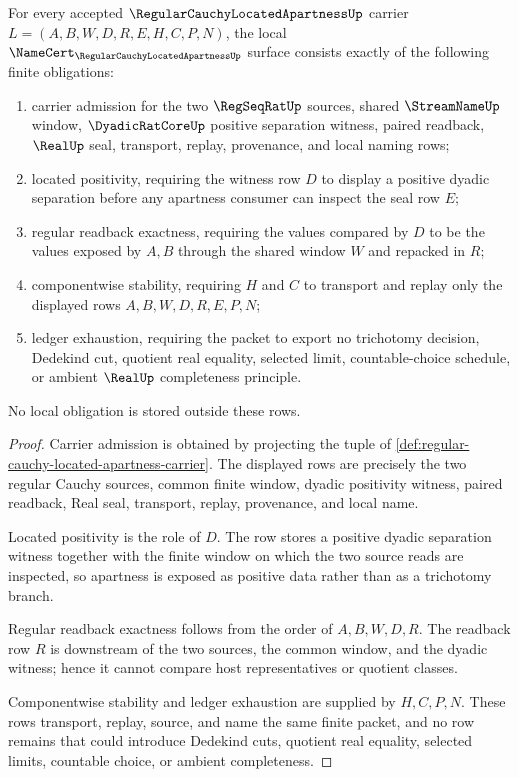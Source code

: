\begin{theorem}
\label{thm:regular-cauchy-located-apartness-namecert-obligations}
For every accepted $\RegularCauchyLocatedApartnessUp$ carrier $L=(A,B,W,D,R,E,H,C,P,N)$, the local $\NameCert_{\RegularCauchyLocatedApartnessUp}$ surface consists exactly of the following finite obligations:
\begin{enumerate}
\item carrier admission for the two $\RegSeqRatUp$ sources, shared $\StreamNameUp$ window, $\DyadicRatCoreUp$ positive separation witness, paired readback, $\RealUp$ seal, transport, replay, provenance, and local naming rows;
\item located positivity, requiring the witness row $D$ to display a positive dyadic separation before any apartness consumer can inspect the seal row $E$;
\item regular readback exactness, requiring the values compared by $D$ to be the values exposed by $A,B$ through the shared window $W$ and repacked in $R$;
\item componentwise stability, requiring $H$ and $C$ to transport and replay only the displayed rows $A,B,W,D,R,E,P,N$;
\item ledger exhaustion, requiring the packet to export no trichotomy decision, Dedekind cut, quotient real equality, selected limit, countable-choice schedule, or ambient $\RealUp$ completeness principle.
\end{enumerate}
No local obligation is stored outside these rows.
\end{theorem}
\begin{proof}
Carrier admission is obtained by projecting the tuple of \autoref{def:regular-cauchy-located-apartness-carrier}. The displayed rows are precisely the two regular Cauchy sources, common finite window, dyadic positivity witness, paired readback, Real seal, transport, replay, provenance, and local name.

Located positivity is the role of $D$. The row stores a positive dyadic separation witness together with the finite window on which the two source reads are inspected, so apartness is exposed as positive data rather than as a trichotomy branch.

Regular readback exactness follows from the order of $A,B,W,D,R$. The readback row $R$ is downstream of the two sources, the common window, and the dyadic witness; hence it cannot compare host representatives or quotient classes.

Componentwise stability and ledger exhaustion are supplied by $H,C,P,N$. These rows transport, replay, source, and name the same finite packet, and no row remains that could introduce Dedekind cuts, quotient real equality, selected limits, countable choice, or ambient completeness.
\end{proof}

